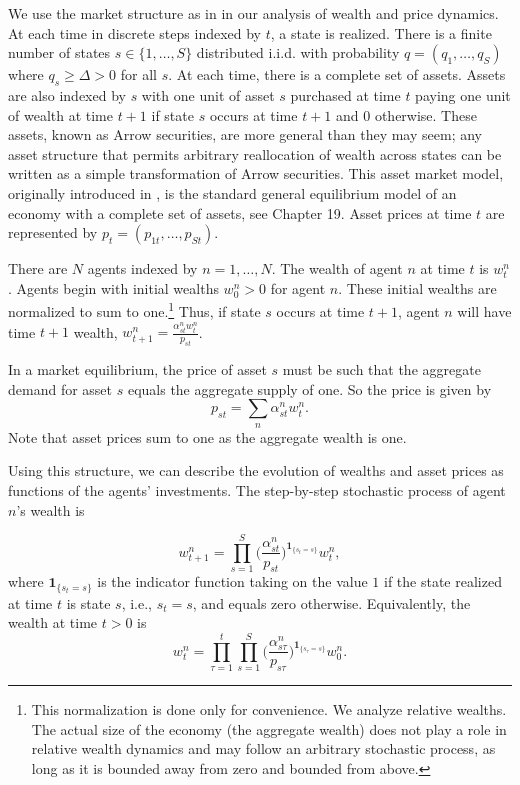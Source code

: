 We use the market structure as in \cite{blumeeasley1992} in our analysis of wealth and price dynamics. 
At each time in discrete steps indexed by $t$, a state is realized. There is a finite number of states $s\in \{1, \dots, S\}$ distributed i.i.d. with probability $q=(q_1, \dots, q_S)$ where $q_s \geq \Delta > 0$ for all $s$. 
At each time, there is a complete set of assets. Assets are also indexed by $s$ with one unit of asset $s$ purchased at time $t$ paying one unit of wealth at time $t+1$ if state $s$ occurs at time $t+1$ and $0$ otherwise. These assets, known as Arrow securities, are more general than they may seem; any asset structure that permits arbitrary reallocation of wealth across states can be written as a simple transformation of Arrow securities. This asset market model, originally introduced in \cite{Arrow}, is the standard general equilibrium model of an economy with a complete set of assets, see \cite{MWG} Chapter 19. Asset prices at time $t$ are represented by $p_t=(p_{1t},\dots, p_{St})$. 

There are $N$ agents indexed by $n=1, \dots, N$. The wealth of agent $n$ at time $t$ is $w^n_t$. Agents begin with initial wealths $w^n_0>0$ for agent $n$. These initial wealths are normalized to sum to one.\footnote{This normalization is done only for convenience. 
We analyze relative wealths. The actual size of the economy (the aggregate wealth) does not play a role in relative wealth dynamics and may follow an arbitrary stochastic process, as long as it is bounded away from zero and bounded from above.}
Thus, if state $s$ occurs at time $t+1$, agent $n$ will have time $t+1$ wealth, $w^n_{t+1} = \frac{\alpha^n_{st}w^n_t}{p_{st}}$. 

In a market equilibrium, the price of asset $s$ must be such that the aggregate demand for asset $s$ equals the aggregate supply of one. So the price is given by 
\begin{equation}
p_{st} = \sum_n \alpha^n_{st}w^n_t.
\end{equation}
Note that asset prices sum to one as the aggregate wealth is one.

Using this structure, we can describe the evolution of wealths and asset prices as functions of the agents' investments. The step-by-step stochastic process of agent $n$'s wealth is

\begin{equation}\label{eq:wealth-evolution}
w^n_{t+1} = \prod_{s=1}^S  \bigg(\frac{\alpha^n_{st}}{p_{st}}\bigg)^{\mathbf{1}_{\{s_t = s\}}} w^n_t,
\end{equation}
where $\mathbf{1}_{\{s_t = s\}}$ is the indicator function taking on the value $1$ if the state realized at time $t$ is state $s$, i.e., $s_t=s$, and equals zero otherwise. Equivalently, the wealth at time $t > 0$ is 
\begin{equation}
w^n_{t}   = \prod_{\tau=1}^{t} \prod_{s=1}^S  \bigg(\frac{\alpha^n_{s\tau}}{p_{s\tau}}\bigg)^{\mathbf{1}_{\{s_\tau = s\}}} w^n_0.
\end{equation}

